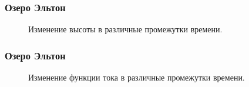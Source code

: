 \documentclass[10pt,utf8,presentation,compress]{beamer}
\begin{document}
\begin{frame}
\frametitle{Озеро Эльтон}
	\begin{figure}[H]
		\centering
		\hfill
		\caption{Изменение высоты в различные промежутки времени.}
	\end{figure}
\end{frame}

\begin{frame}
\frametitle{Озеро Эльтон}
	\begin{figure}[H]
		\centering
		\hfill
		\caption{Изменение функции тока в различные промежутки времени.}
	\end{figure}
\end{frame}
\end{document}
